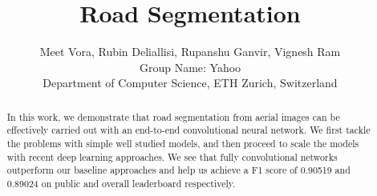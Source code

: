 \documentclass[10pt,conference,compsocconf]{IEEEtran}
\begin{document}
\title{Road Segmentation}

\author{
  Meet Vora, Rubin Deliallisi, Rupanshu Ganvir, Vignesh Ram \\
  Group Name: Yahoo \\
  Department of Computer Science, ETH Zurich, Switzerland
}

\maketitle

\begin{abstract}
In this work, we demonstrate that road segmentation from aerial images can be effectively carried out with an end-to-end convolutional neural network. We first tackle the problems with simple well studied models, and then proceed to scale the models with recent deep learning approaches. We see that fully convolutional networks outperform our baseline approaches and help us achieve a F1 score of 0.90519 and 0.89024 on public and overall leaderboard respectively. 
\end{abstract}










\end{document}

